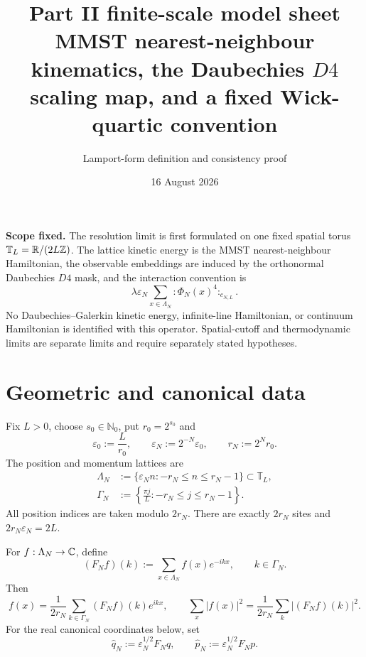 \documentclass[11pt,a4paper]{article}
\title{Part II finite-scale model sheet\\[3pt]
\large MMST nearest-neighbour kinematics, the Daubechies \(D4\) scaling map, and a fixed Wick-quartic convention}
\author{Lamport-form definition and consistency proof}
\date{16 August 2026}
\newcommand{\eps}{\varepsilon}
\newcommand{\T}{\mathbb T}
\begin{document}
\maketitle

\begin{resultbox}
\textbf{Scope fixed.}  The resolution limit is first formulated on one fixed spatial
torus \(\T_L=\R/(2L\mathbb Z)\).  The lattice kinetic energy is the MMST
nearest-neighbour Hamiltonian, the observable embeddings are induced by the orthonormal
Daubechies \(D4\) mask, and the interaction convention is
\[
 \lambda\eps_N\sum_{x\in\Lambda_N}{:}\Phi_N(x)^4{:}_{c_{N,L}}.
\]
No Daubechies--Galerkin kinetic energy, infinite-line Hamiltonian, or continuum
Hamiltonian is identified with this operator.  Spatial-cutoff and thermodynamic limits
are separate limits and require separately stated hypotheses.
\end{resultbox}

\tableofcontents

\section{Geometric and canonical data}


Fix \(L>0\), choose \(s_0\in\mathbb N_0\), put \(r_0=2^{s_0}\) and
\[
 \eps_0:=\frac{L}{r_0},\qquad
 \eps_N:=2^{-N}\eps_0,\qquad r_N:=2^Nr_0.                         \tag{1.1}
\]
The position and momentum lattices are
\begin{align}
 \Lambda_N&:=\{\eps_Nn:-r_N\le n\le r_N-1\}\subset\T_L,\\
 \Gamma_N&:=\left\{\frac{\pi j}{L}:-r_N\le j\le r_N-1\right\}.
                                                                    \tag{1.2}
\end{align}
All position indices are taken modulo \(2r_N\).  There are exactly \(2r_N\)
sites and \(2r_N\eps_N=2L\).


For \(f:\Lambda_N\to\mathbb C\), define
\[
 (F_Nf)(k):=\sum_{x\in\Lambda_N}f(x)e^{-ikx},\qquad k\in\Gamma_N. \tag{1.3}
\]
Then
\[
 f(x)=\frac1{2r_N}\sum_{k\in\Gamma_N}(F_Nf)(k)e^{ikx},\qquad
 \sum_x|f(x)|^2=\frac1{2r_N}\sum_k|(F_Nf)(k)|^2.                 \tag{1.4}
\]
For the real canonical coordinates below, set
\[
 \widehat q_N:=\eps_N^{1/2}F_Nq,\qquad
 \widehat p_N:=\eps_N^{1/2}F_Np.                                \tag{1.5}
\]
\end{document}
